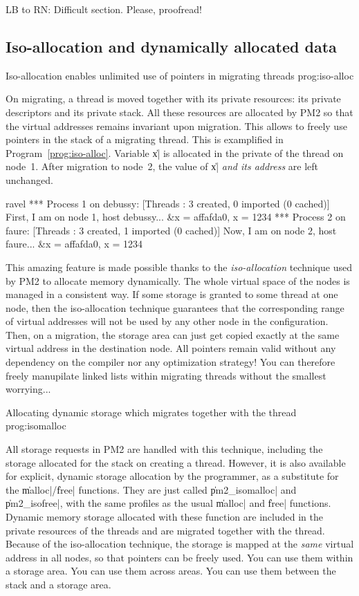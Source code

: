 \begin{note}
  LB to RN: Difficult section. Please, proofread!
\end{note}


\subsection{Iso-allocation and dynamically allocated data}

 {Iso-allocation enables unlimited use of
  pointers in migrating threads} {prog:iso-alloc}

On migrating, a thread is moved together with its private resources:
its private descriptors and its private stack. All these resources are
allocated by PM2 so that the virtual addresses remains invariant upon
migration. This allows to freely use pointers in the stack of a
migrating thread. This is examplified in
Program~\ref{prog:iso-alloc}. Variable \|x| is allocated in the
private of the thread on node~1. After migration to node~2, the value
of \|x| \emph{and its address} are left unchanged.
\begin{shell}
ravel%
*** Process 1 on debussy:
[Threads : 3 created, 0 imported (0 cached)]
First, I am on node 1, host debussy... &x = affafda0, x = 1234
*** Process 2 on faure:
[Threads : 3 created, 1 imported (0 cached)]
Now, I am on node 2, host faure... &x = affafda0, x = 1234
\end{shell}

This amazing feature is made possible thanks to the
\emph{iso-allocation} technique used by PM2 to allocate memory
dynamically. The whole virtual space of the nodes is managed in a
consistent way. If some storage is granted to some thread at one node,
then the iso-allocation technique guarantees that the corresponding
range of virtual addresses will not be used by any other node in the
configuration. Then, on a migration, the storage area can just get
copied exactly at the same virtual address in the destination node.
All pointers remain valid without any dependency on the compiler nor
any optimization strategy! You can therefore freely manupilate linked
lists within migrating threads without the smallest worrying...

 {Allocating dynamic storage which
  migrates together with the thread} {prog:isomalloc}

All storage requests in PM2 are handled with this technique, including
the storage allocated for the stack on creating a thread. However, it
is also available for explicit, dynamic storage allocation by the
programmer, as a substitute for the \|malloc|/\|free| functions. They
are just called \|pm2_isomalloc| and \|pm2_isofree|, with the same
profiles as the usual \|malloc| and \|free| functions. Dynamic memory
storage allocated with these function are included in the private
resources of the threads and are migrated together with the
thread. Because of the iso-allocation technique, the storage is mapped
at the \emph{same} virtual address in all nodes, so that pointers can
be freely used. You can use them within a storage area. You can use
them across areas. You can use them between the stack and a storage
area. 

